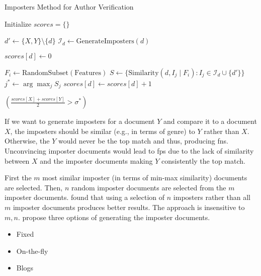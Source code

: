 \begin{algorithm}
    \caption{Imposters Method for Author Verification}
    \label{alg:imposter_algo}
    \begin{algorithmic}[1]
    
        \State Initialize $scores = \{\}$ 
    
            \State $d' \gets \{X, Y\} \setminus \{d\}$ 
            \State $\mathcal{I}_d \gets \text{GenerateImposters}(d)$ 
    
            \State $scores[d] \gets 0$ 
    
                \State $F_i \gets \text{RandomSubset}(\text{Features})$ 
                \State $S \gets \{ \text{Similarity}(d, I_j \mid F_i) : I_j \in \mathcal{I}_d \cup \{d'\} \}$ 
                \State $j^* \gets \arg\max_j S_j$ 
                    \State $scores[d] \gets scores[d] + 1$ 

                \EndIf
            \EndFor
        \EndFor
    
        \State \Return $\left( \frac{scores[X] + scores[Y]}{2} > \sigma^* \right)$ 
    \EndProcedure
    \end{algorithmic}
    \end{algorithm}
    
If we want to generate imposters for a document $Y$ and compare it to a document $X$, 
the imposters should be similar (e.g., in terms of genre) to $Y$ rather than $X$.
Otherwise, the $Y$ would never be the top match and thus, producing \acp{fn}.
Unconvincing imposter documents would lead to \acp{fp} due to the lack of similarity between $X$ and the imposter documents making $Y$ consistently the top match.

First the $m$ most similar imposter (in terms of min-max similarity) documents are selected.
Then, $n$ random imposter documents are selected from the $m$ imposter documents.
\citet{koppel_determining_2014} found that using a selection of $n$ imposters rather than all $m$ imposter documents produces better results.
The approach is insensitive to $m,n$.
\citet{koppel_determining_2014} propose three options of generating the imposter documents.
\begin{itemize}
    \item Fixed
    \item On-the-fly
    \item Blogs
\end{itemize}

